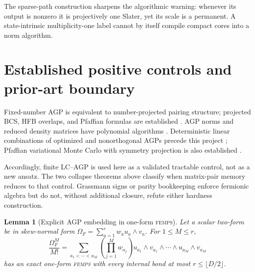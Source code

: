 \documentclass[aps,pra,reprint,superscriptaddress,nofootinbib,longbibliography,showkeys]{revtex4-2}
\newtheorem{lemma}[theorem]{Lemma}
\theoremstyle{definition}
\newcommand{\FEMPS}{\textnormal{\textsc{femps}}}
\begin{document}
The sparse-path construction sharpens the algorithmic warning: whenever its output is nonzero it is
projectively one Slater, yet its scale is a permanent.  A state-intrinsic
multiplicity-one label cannot by itself compile compact cores into a norm
algorithm.

\section{Established positive controls and prior-art boundary}

Fixed-number AGP is equivalent to number-projected pairing structure; projected
BCS, HFB overlaps, and Pfaffian formulas are established
\cite{DukelskyPittelEsebbag2016PBCS,Robledo2009HFBOverlap,
BertschRobledo2012SymmetryRestoration}.  AGP norms and
reduced density matrices have polynomial algorithms
\cite{KhamoshiHendersonScuseria2019AGPRDM}.  Deterministic linear combinations
of optimized and nonorthogonal AGPs precede this project
\cite{UemuraKasamatsuSugino2015AGPCI,
DuttaChenHendersonScuseria2021NonorthogonalAGP}; Pfaffian variational Monte
Carlo with symmetry projection is also established
\cite{TaharaImada2008mVMC,BajdichMitasWagnerSchmidt2008PfaffianQMC}.

Accordingly, finite LC--AGP is used here as a validated tractable control, not
as a new ansatz.  The two collapse theorems above classify when matrix-pair
memory reduces to that control.  Grassmann signs or parity bookkeeping enforce
fermionic algebra but do not, without additional closure, refute either
hardness construction.

\begin{lemma}[Explicit AGP embedding in one-form \FEMPS{}]
Let a scalar two-form be in skew-normal form
$\Omega_F=\sum_{a=1}^r w_a u_a\wedge v_a$.  For $1\le M\le r$,
\[
 \frac{\Omega_F^M}{M!}
 =\sum_{a_1<\cdots<a_M}\left(\prod_{j=1}^M w_{a_j}\right)
 u_{a_1}\wedge v_{a_1}\wedge\cdots\wedge
 u_{a_M}\wedge v_{a_M}
\]
has an exact one-form \FEMPS{} with every internal bond at most
$r\le\lfloor D/2\rfloor$.
\end{lemma}
\end{document}
